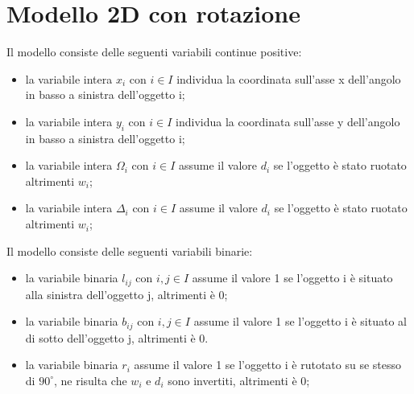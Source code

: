 \newpage

\section{Modello 2D con rotazione}
\noindent Il modello consiste delle seguenti variabili continue positive:
\begin{itemize}
	\item la variabile intera $x_{i}$ con $i \in I$ individua la coordinata sull'asse x dell'angolo in basso a sinistra dell'oggetto i;
	\item la variabile intera $y_{i}$ con $i \in I$ individua la coordinata sull'asse y dell'angolo in basso a sinistra dell'oggetto i;
	\item la variabile intera $\Omega_{i}$ con $i \in I$ assume il valore $d_i$ se l'oggetto è stato ruotato altrimenti $w_i$;
	\item la variabile intera $\Delta_{i}$ con $i \in I$ assume il valore $d_i$ se l'oggetto è stato ruotato altrimenti $w_i$;
\end{itemize}
Il modello consiste delle seguenti variabili binarie:
\begin{itemize}
	\item la variabile binaria $l_{ij}$ con $i,j \in I$ assume il valore 1 se l'oggetto i è situato alla sinistra dell'oggetto j, altrimenti è 0;
	\item la variabile binaria $b_{ij}$ con $i,j \in I$ assume il valore 1 se l'oggetto i è situato al di sotto dell'oggetto j, altrimenti è 0.
	\item la variabile binaria $r_{i}$ assume il valore 1 se l'oggetto i è rutotato su se stesso di $90^{\circ}$, ne risulta che $w_{i}$ e $d_{i}$ sono invertiti, altrimenti è 0;
\end{itemize}

